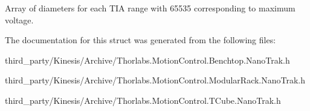 Array of diameters for each T\+IA range with 65535 corresponding to maximum voltage. 



The documentation for this struct was generated from the following files\+:\begin{DoxyCompactItemize}
\item 
third\+\_\+party/\+Kinesis/\+Archive/Thorlabs.\+Motion\+Control.\+Benchtop.\+Nano\+Trak.\+h\item 
third\+\_\+party/\+Kinesis/\+Archive/Thorlabs.\+Motion\+Control.\+Modular\+Rack.\+Nano\+Trak.\+h\item 
third\+\_\+party/\+Kinesis/\+Archive/Thorlabs.\+Motion\+Control.\+T\+Cube.\+Nano\+Trak.\+h\end{DoxyCompactItemize}
